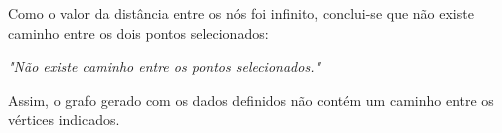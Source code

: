 Como o valor da distância entre os nós foi infinito, conclui-se que não existe caminho entre os dois pontos selecionados:
\begin{center}
\textit{"Não existe caminho entre os pontos selecionados."}
\end{center}

\bigskip

\noindent Assim, o grafo gerado com os dados definidos não contém um caminho entre os vértices indicados.
